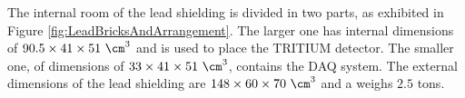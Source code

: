 The internal room of the lead shielding is divided in two parts, as exhibited in Figure \ref{fig:LeadBricksAndArrangement}. The larger one has internal dimensions of $90.5 \times 41 \times 51~\cm^3$ and is used to place the TRITIUM detector. The smaller one, of dimensions of $33 \times 41 \times 51~\cm^3$, contains the DAQ system. The external dimensions of the lead shielding are $148 \times 60 \times 70~\cm^3$ and a weighs $2.5$ tons.
